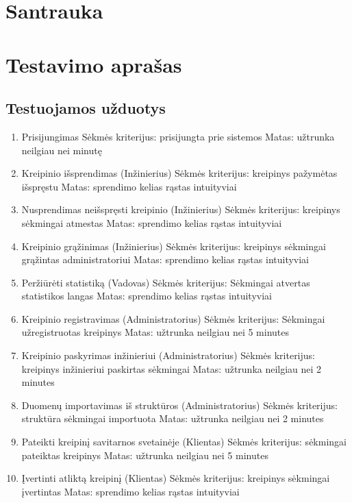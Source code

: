 \section{Santrauka}

	

\section{Testavimo aprašas}

	\subsection{Testuojamos užduotys}
	
		\begin{enumerate}
			\item Prisijungimas
				\subitem Sėkmės kriterijus: prisijungta prie sistemos
				\subitem Matas: užtrunka neilgiau nei minutę
			\item Kreipinio išsprendimas (Inžinierius)
				\subitem Sėkmės kriterijus: kreipinys pažymėtas išspręstu
				\subitem Matas: sprendimo kelias rąstas intuityviai
			\item Nusprendimas neišspręsti kreipinio (Inžinierius)
				\subitem Sėkmės kriterijus: kreipinys sėkmingai atmestas
				\subitem Matas: sprendimo kelias rąstas intuityviai
			\item Kreipinio grąžinimas (Inžinierius)
				\subitem Sėkmės kriterijus: kreipinys sėkmingai grąžintas administratoriui
				\subitem Matas: sprendimo kelias rąstas intuityviai
			\item Peržiūrėti statistiką (Vadovas)
				\subitem Sėkmės kriterijus: Sėkmingai atvertas statistikos langas
				\subitem Matas: sprendimo kelias rąstas intuityviai
			\item Kreipinio registravimas (Administratorius)
				\subitem Sėkmės kriterijus: Sėkmingai užregistruotas kreipinys
				\subitem Matas: užtrunka neilgiau nei 5 minutes
			\item Kreipinio paskyrimas inžinieriui (Administratorius)
				\subitem Sėkmės kriterijus: kreipinys inžinieriui paskirtas sėkmingai
				\subitem Matas: užtrunka neilgiau nei 2 minutes
			\item Duomenų importavimas iš struktūros (Administratorius)
				\subitem Sėkmės kriterijus: struktūra sėkmingai importuota
				\subitem Matas: užtrunka neilgiau nei 2 minutes
			\item Pateikti kreipinį savitarnos svetainėje (Klientas)
				\subitem Sėkmės kriterijus: sėkmingai pateiktas kreipinys
				\subitem Matas: užtrunka neilgiau nei 5 minutes
			\item Įvertinti atliktą kreipinį (Klientas)
				\subitem Sėkmės kriterijus: kreipinys sėkmingai įvertintas
				\subitem Matas: sprendimo kelias rąstas intuityviai
		\end{enumerate}
	
